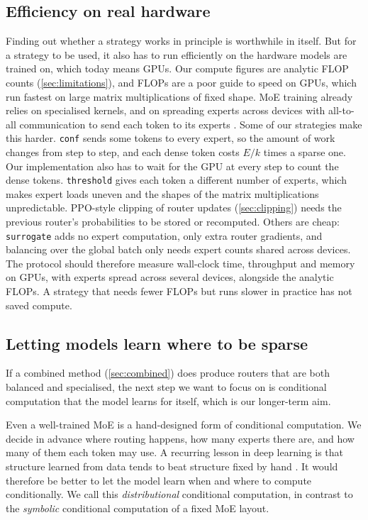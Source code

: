 \documentclass[10pt]{article}
\theoremstyle{definition}
\theoremstyle{remark}
\newcommand{\code}[1]{\texttt{#1}}
\begin{document}
\subsection{Efficiency on real hardware}
\label{sec:hardware}
Finding out whether a strategy works in principle is worthwhile in itself. But for a strategy to be used, it also has to run efficiently on the hardware models are trained on, which today means GPUs. Our compute figures are analytic FLOP counts (\cref{sec:limitations}), and FLOPs are a poor guide to speed on GPUs, which run fastest on large matrix multiplications of fixed shape. MoE training already relies on specialised kernels, and on spreading experts across devices with all-to-all communication to send each token to its experts \citep{lepikhin2021gshard,rajbhandari2022deepspeedmoe,gale2023megablocks}. Some of our strategies make this harder. \code{conf} sends some tokens to every expert, so the amount of work changes from step to step, and each dense token costs $E/k$ times a sparse one. Our implementation also has to wait for the GPU at every step to count the dense tokens. \code{threshold} gives each token a different number of experts, which makes expert loads uneven and the shapes of the matrix multiplications unpredictable. PPO-style clipping of router updates (\cref{sec:clipping}) needs the previous router's probabilities to be stored or recomputed. Others are cheap: \code{surrogate} adds no expert computation, only extra router gradients, and balancing over the global batch only needs expert counts shared across devices. The protocol should therefore measure wall-clock time, throughput and memory on GPUs, with experts spread across several devices, alongside the analytic FLOPs. A strategy that needs fewer FLOPs but runs slower in practice has not saved compute.

\subsection{Letting models learn where to be sparse}
\label{sec:future}
If a combined method (\cref{sec:combined}) does produce routers that are both balanced and specialised, the next step we want to focus on is conditional computation that the model learns for itself, which is our longer-term aim.

Even a well-trained MoE is a hand-designed form of conditional computation. We decide in advance where routing happens, how many experts there are, and how many of them each token may use. A recurring lesson in deep learning is that structure learned from data tends to beat structure fixed by hand \citep{sutton2019bitter}. It would therefore be better to let the model learn when and where to compute conditionally. We call this \emph{distributional} conditional computation, in contrast to the \emph{symbolic} conditional computation of a fixed MoE layout.
\end{document}

